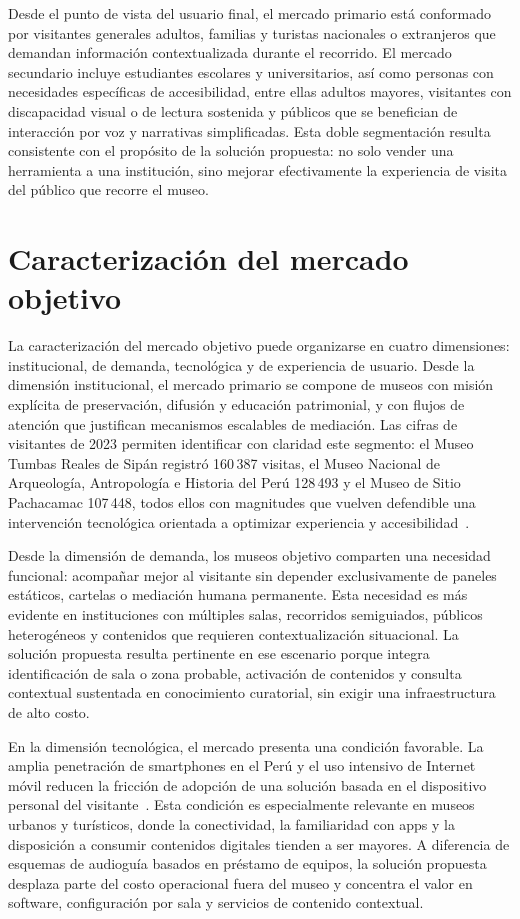 Desde el punto de vista del usuario final, el mercado primario está conformado por visitantes generales adultos, familias y turistas nacionales o extranjeros que demandan información contextualizada durante el recorrido. El mercado secundario incluye estudiantes escolares y universitarios, así como personas con necesidades específicas de accesibilidad, entre ellas adultos mayores, visitantes con discapacidad visual o de lectura sostenida y públicos que se benefician de interacción por voz y narrativas simplificadas. Esta doble segmentación resulta consistente con el propósito de la solución propuesta: no solo vender una herramienta a una institución, sino mejorar efectivamente la experiencia de visita del público que recorre el museo.

\section{Caracterización del mercado objetivo}

La caracterización del mercado objetivo puede organizarse en cuatro dimensiones: institucional, de demanda, tecnológica y de experiencia de usuario. Desde la dimensión institucional, el mercado primario se compone de museos con misión explícita de preservación, difusión y educación patrimonial, y con flujos de atención que justifican mecanismos escalables de mediación. Las cifras de visitantes de 2023 permiten identificar con claridad este segmento: el Museo Tumbas Reales de Sipán registró 160\,387 visitas, el Museo Nacional de Arqueología, Antropología e Historia del Perú 128\,493 y el Museo de Sitio Pachacamac 107\,448, todos ellos con magnitudes que vuelven defendible una intervención tecnológica orientada a optimizar experiencia y accesibilidad~\cite{infocultura2023visitantes}.

Desde la dimensión de demanda, los museos objetivo comparten una necesidad funcional: acompañar mejor al visitante sin depender exclusivamente de paneles estáticos, cartelas o mediación humana permanente. Esta necesidad es más evidente en instituciones con múltiples salas, recorridos semiguiados, públicos heterogéneos y contenidos que requieren contextualización situacional. La solución propuesta resulta pertinente en ese escenario porque integra identificación de sala o zona probable, activación de contenidos y consulta contextual sustentada en conocimiento curatorial, sin exigir una infraestructura de alto costo.

En la dimensión tecnológica, el mercado presenta una condición favorable. La amplia penetración de smartphones en el Perú y el uso intensivo de Internet móvil reducen la fricción de adopción de una solución basada en el dispositivo personal del visitante~\cite{osiptel2023smartphone,osiptel2024smartphone}. Esta condición es especialmente relevante en museos urbanos y turísticos, donde la conectividad, la familiaridad con apps y la disposición a consumir contenidos digitales tienden a ser mayores. A diferencia de esquemas de audioguía basados en préstamo de equipos, la solución propuesta desplaza parte del costo operacional fuera del museo y concentra el valor en software, configuración por sala y servicios de contenido contextual.

